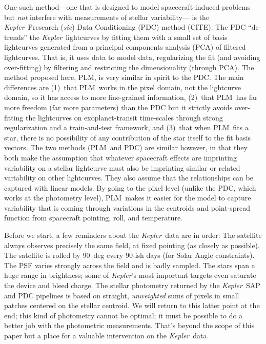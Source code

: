 \documentclass[12pt, preprint]{aastex}
\newcommand{\notenglish}[1]{\textit{#1}}
\newcommand{\sic}{\notenglish{sic}}
\newcommand{\project}[1]{\textsl{#1}}
\newcommand{\Kepler}{\project{Kepler}}
\newcommand{\name}{PLM}
\begin{document}
One such method---one that is designed to model spacecraft-induced problems
  but \emph{not} interfere with measurements of stellar variability---%
  is the \Kepler\ Presearch (\sic) Data Conditioning (PDC) method (CITE).
The PDC ``de-trends'' the \Kepler\ lightcurves by fitting them with a small set of basis lightcurves
  generated from a principal components analysis (PCA) of filtered lightcurves.
That is, it uses data to model data,
  regularizing the fit (and avoiding over-fitting) by filtering and restricting the dimensionality (through PCA).
The method proposed here, \name, is very similar in spirit to the PDC.
The main differences are
  (1)~that \name\ works in the pixel domain, not the lightcurve domain, so it has access to more fine-grained information,
  (2)~that \name\ has far more freedom (far more parameters) than the PDC
  but it strictly avoids over-fitting the lightcurves on exoplanet-transit time-scales
  through strong regularization and a train-and-test framework, and
  (3)~that when \name\ fits a star, there is no possibility of any contribution of the star itself to the fit basis vectors.
The two methods (\name\ and PDC) are similar however,
  in that they both make the assumption that whatever spacecraft effects are imprinting variability on a stellar lightcurve
  must also be imprinting similar or related variability on other lightcurves.
They also assume that the relationships can be captured with linear models.
By going to the pixel level (unlike the PDC, which works at the photometry level),
  \name\ makes it easier for the model to capture variability
  that is coming through variations in the centroids and point-spread function
  from spacecraft pointing, roll, and temperature.

Before we start, a few reminders about the \Kepler\ data are in order:
The satellite always observes precisely the same field, at fixed pointing (as closely as possible).
The satellite is rolled by 90~deg every 90-ish days (for Solar Angle constraints).
The PSF varies strongly across the field and is badly sampled.
The stars span a huge range in brightness;
  some of \Kepler's most important targets even saturate the device and bleed charge.
The stellar photometry returned by the \Kepler\ SAP and PDC pipelines is based on
  straight, \emph{unweighted} sums of pixels in small patches centered on the stellar centroid.
We will return to this latter point at the end;
  this kind of photometry cannot be optimal;
  it must be possible to do a better job with the photometric measurements.
That's beyond the scope of this paper but a place for a valuable intervention on the \Kepler\ data.
\end{document}
